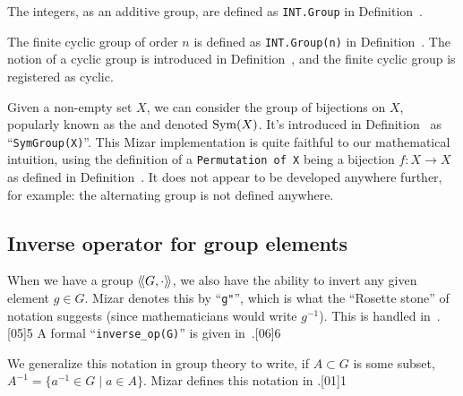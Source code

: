 \begin{example}
The integers, as an additive group, are defined as \lstinline|INT.Group|
in Definition~.
\end{example}

\begin{example}\label{example:introduction:cyclic-group}
The finite cyclic group of order $n$ is defined as \lstinline|INT.Group(n)|
in Definition~. The notion of a cyclic group is
introduced in Definition~, and the finite cyclic
group is registered as cyclic.
\end{example}

\begin{example}
Given a non-empty set $X$, we can consider the group of bijections on
$X$, popularly known as the  and denoted
$\operatorname{Sym}(X)$. It's introduced in Definition~ as
``\lstinline{SymGroup(X)}''.
This Mizar implementation is quite faithful to our mathematical
intuition, using the definition of a \lstinline{Permutation of X} being
a bijection $f\colon X\to X$ as defined in Definition~. It
does not appear to be developed anywhere further, for example: the
alternating group is not defined anywhere.
\end{example}


\subsection{Inverse operator for group elements}
When we have a group $\struct{G,\cdot}$, we also have the ability
to invert any given element $g\in G$. Mizar denotes this by
``\lstinline{g"}'', which is what the ``Rosette stone'' of notation suggests
(since mathematicians would write $g^{-1}$). This is handled in~.[05]{5}
A formal ``\lstinline{inverse_op(G)}'' is given in~.[06]{6}

\begin{notation}
We generalize this notation in group theory to write, if $A\subset G$ is
some subset, $A^{-1}=\{a^{-1}\in G\mid a\in A\}$. Mizar defines this
notation in .[01]{1}
\end{notation}

